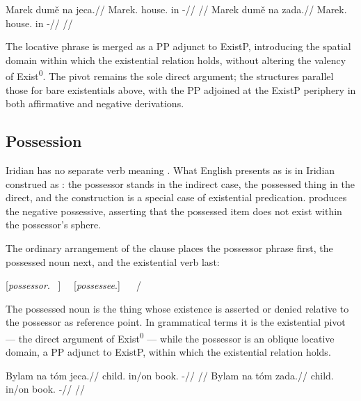 \pex
\a
\begingl
\gla Marek dumě na jeca.//
\glb Marek.\Dir{} house.\Ind{} in \Exst{}-\Cont{}//
\glft {}//
\endgl
\a
\begingl
\gla Marek dumě na zada.//
\glb Marek.\Dir{} house.\Ind{} in \NegExst{}-\Cont{}//
\glft {}//
\endgl
\xe

\noindent The locative phrase is merged as a PP adjunct to ExistP, introducing
the spatial domain within which the existential relation holds, without altering
the valency of Exist\textsuperscript{0}. The pivot remains the sole direct
argument; the structures parallel those for bare existentials above, with the PP
adjoined at the ExistP periphery in both affirmative and negative derivations.


\subsection{Possession}\label{sec:existence-possession}

Iridian has no separate verb meaning . What English presents as
 is in Iridian construed as : the
possessor stands in the indirect case, the possessed thing in the direct, and
the construction is a special case of existential predication. 
produces the negative possessive, asserting that the possessed item does not
exist within the possessor's sphere.

The ordinary arrangement of the clause places the possessor phrase first, the
possessed noun next, and the existential verb last:

\begin{center}
[\emph{possessor}.\Ind{} \ ] \ \ [\emph{possessee}.\Dir{}] \ \  / 
\end{center}

\noindent The possessed noun is the thing whose existence is asserted or denied
relative to the possessor as reference point. In grammatical terms it is the
existential pivot --- the direct argument of Exist\textsuperscript{0} --- while
the possessor is an oblique locative domain, a PP adjunct to ExistP, within
which the existential relation holds.

\pex
\a
\begingl
\gla Bylam na tóm jeca.//
\glb child.\Ind{} in/on book.\Dir{} \Exst{}-\Cont{}//
\glft {}//
\endgl
\a
\begingl
\gla Bylam na tóm zada.//
\glb child.\Ind{} in/on book.\Dir{} \NegExst{}-\Cont{}//
\glft {}//
\endgl
\xe


